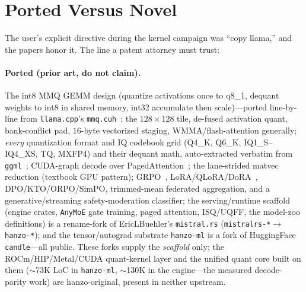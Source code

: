 \documentclass[11pt]{article}
\begin{document}
\section{Ported Versus Novel}
\label{sec:ip}

The user's explicit directive during the kernel campaign was ``copy llama,'' and the papers honor it. The line a patent attorney must trust:

\paragraph{Ported (prior art, do not claim).} The int8 MMQ GEMM design (quantize activations once to q8\_1, dequant weights to int8 in shared memory, int32 accumulate then scale)---ported line-by-line from \texttt{llama.cpp}'s \texttt{mmq.cuh}~\cite{llamacpp}; the $128\times128$ tile, de-fused activation quant, bank-conflict pad, $16$-byte vectorized staging, WMMA/flash-attention generally; \emph{every} quantization format and IQ codebook grid (Q4\_K, Q6\_K, IQ1\_S--IQ4\_XS, TQ, MXFP4) and their dequant math, auto-extracted verbatim from \texttt{ggml}~\cite{ggml}; CUDA-graph decode over PagedAttention~\cite{kwon2023}; the lane-strided matvec reduction (textbook GPU pattern); GRPO~\cite{grpo}, LoRA/QLoRA/DoRA~\cite{lora,qlora}, DPO/KTO/ORPO/SimPO, trimmed-mean federated aggregation, and a generative/streaming safety-moderation classifier; the serving/runtime scaffold (engine crates, \texttt{AnyMoE} gate training, paged attention, ISQ/UQFF, the model-zoo definitions) is a rename-fork of EricLBuehler's \texttt{mistral.rs} (\texttt{mistralrs-*}$\to$\texttt{hanzo-*}); and the tensor/autograd substrate \texttt{hanzo-ml} is a fork of HuggingFace \texttt{candle}---all public. These forks supply the \emph{scaffold} only; the ROCm/HIP/Metal/CUDA quant-kernel layer and the unified quant core built on them ($\sim$73K LoC in \texttt{hanzo-ml}, $\sim$130K in the engine---the measured decode-parity work) are hanzo-original, present in neither upstream.
\end{document}
